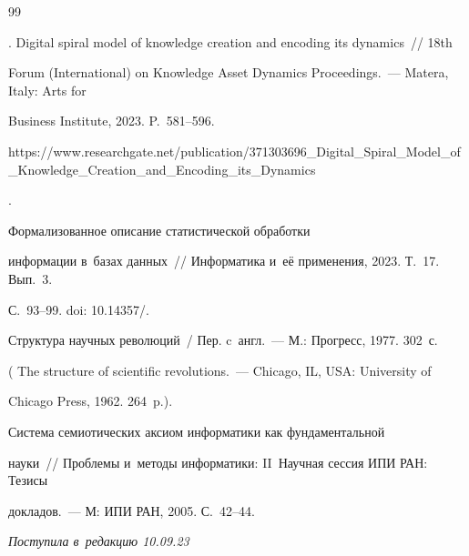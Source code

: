 {{\begin{thebibliography}{99}

. Digital spiral model of knowledge creation and encoding its dynamics~/\!\!/ 18th 

Forum (International) on Knowledge Asset Dynamics Proceedings.~--- Matera, Italy: Arts for 

Business Institute, 2023. P.~581--596. {\sf 

https://www.\linebreak researchgate.net/publication/371303696\_Digital\_Spiral\_Model\_of\_Knowledge\_\linebreak Creation\_and\_Encoding\_its\_Dynamics}.


 Формализованное описание статистической обработки 

информации в~базах данных~/\!\!/ Информатика и~её применения, 2023. Т.~17. Вып.~3.  

С.~93--99. doi: 10.14357\!/.


 Структура научных революций~/ Пер. c~англ.~--- М.: Прогресс, 1977. 302~с. 

( The structure of scientific revolutions.~--- Chicago, IL, USA: University of 

Chicago Press, 1962. 264~p.).


 Система семиотических аксиом информатики как фундаментальной 

науки~/\!\!/ Проб\-ле\-мы и~методы информатики: II~Научная сессия ИПИ РАН: Тезисы 

докладов.~--- М: ИПИ РАН, 2005. С.~42--44.

   

   

      \end{thebibliography}

} }







\vspace*{-6pt}



\hfill{\small\textit{Поступила в~редакцию 10.09.23}}






